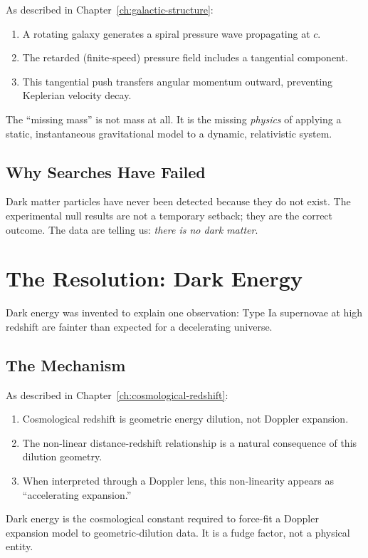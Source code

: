 As described in Chapter~\ref{ch:galactic-structure}:
\begin{enumerate}
  \item A rotating galaxy generates a spiral pressure wave propagating at $c$.
  \item The retarded (finite-speed) pressure field includes a tangential component.
  \item This tangential push transfers angular momentum outward, preventing Keplerian velocity decay.
\end{enumerate}

The ``missing mass'' is not mass at all. It is the missing \emph{physics} of applying a static, instantaneous gravitational model to a dynamic, relativistic system.

\subsection{Why Searches Have Failed}

Dark matter particles have never been detected because they do not exist. The experimental null results are not a temporary setback; they are the correct outcome. The data are telling us: \emph{there is no dark matter}.


\section{The Resolution: Dark Energy}

Dark energy was invented to explain one observation: Type Ia supernovae at high redshift are fainter than expected for a decelerating universe.

\subsection{The Mechanism}

As described in Chapter~\ref{ch:cosmological-redshift}:
\begin{enumerate}
  \item Cosmological redshift is geometric energy dilution, not Doppler expansion.
  \item The non-linear distance-redshift relationship is a natural consequence of this dilution geometry.
  \item When interpreted through a Doppler lens, this non-linearity appears as ``accelerating expansion.''
\end{enumerate}

Dark energy is the cosmological constant required to force-fit a Doppler expansion model to geometric-dilution data. It is a fudge factor, not a physical entity.


